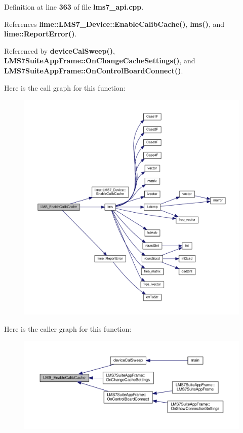Definition at line {\bf 363} of file {\bf lms7\+\_\+api.\+cpp}.



References {\bf lime\+::\+L\+M\+S7\+\_\+\+Device\+::\+Enable\+Calib\+Cache()}, {\bf lms()}, and {\bf lime\+::\+Report\+Error()}.



Referenced by {\bf device\+Cal\+Sweep()}, {\bf L\+M\+S7\+Suite\+App\+Frame\+::\+On\+Change\+Cache\+Settings()}, and {\bf L\+M\+S7\+Suite\+App\+Frame\+::\+On\+Control\+Board\+Connect()}.



Here is the call graph for this function\+:
\nopagebreak
\begin{figure}[H]
\begin{center}
\leavevmode
\includegraphics[width=350pt]{df/de1/lms7__api_8cpp_a874c42499ec6b140f9037f7b3d9ddc8b_cgraph}
\end{center}
\end{figure}




Here is the caller graph for this function\+:
\nopagebreak
\begin{figure}[H]
\begin{center}
\leavevmode
\includegraphics[width=350pt]{df/de1/lms7__api_8cpp_a874c42499ec6b140f9037f7b3d9ddc8b_icgraph}
\end{center}
\end{figure}



